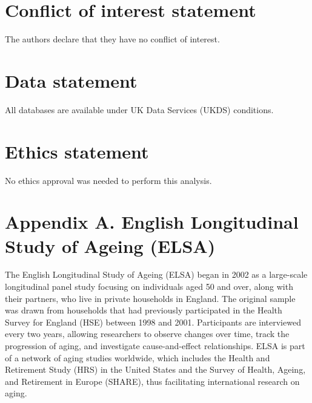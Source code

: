 \documentclass[arguments, manuscript, 11pt]{aastex631}
\begin{document}
\vspace{0.75cm}
\singlespacing
\section*{Conflict of interest statement}

The authors declare that they have no conflict of interest.

\section*{Data statement}

All databases are available under UK Data Services (UKDS) conditions.

\section*{Ethics statement}

No ethics approval was needed to perform this analysis. 


\newpage
\singlespacing
\setlength\bibsep{0pt}





\clearpage
\FloatBarrier
{}
\section*{Appendix A. English Longitudinal Study of Ageing (ELSA)} 
\label{sec:appendixa}
\setcounter{table}{0}
\renewcommand{\thetable}{A\arabic{table}}
\singlespacing
\small
The English Longitudinal Study of Ageing (ELSA) began in 2002 as a large-scale longitudinal panel study focusing on individuals aged 50 and over, along with their partners, who live in private households in England. The original sample was drawn from households that had previously participated in the Health Survey for England (HSE) between 1998 and 2001. Participants are interviewed every two years, allowing researchers to observe changes over time, track the progression of aging, and investigate cause-and-effect relationships. ELSA is part of a network of aging studies worldwide, which includes the Health and Retirement Study (HRS) in the United States and the Survey of Health, Ageing, and Retirement in Europe (SHARE), thus facilitating international research on aging.
\end{document}
